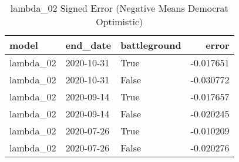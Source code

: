 \begin{table}
\centering
\caption{lambda_02 Signed Error
(Negative Means Democrat Optimistic)}
\label{table:lambda\_02\_signed\_error\_time\_series}
\begin{tabular}{lllr}
\toprule
     model &    end\_date &  battleground &     error \\
\midrule
 lambda\_02 &  2020-10-31 &          True & -0.017651 \\
 lambda\_02 &  2020-10-31 &         False & -0.030772 \\
 lambda\_02 &  2020-09-14 &          True & -0.017657 \\
 lambda\_02 &  2020-09-14 &         False & -0.020245 \\
 lambda\_02 &  2020-07-26 &          True & -0.010209 \\
 lambda\_02 &  2020-07-26 &         False & -0.020276 \\
\bottomrule
\end{tabular}
\end{table}
